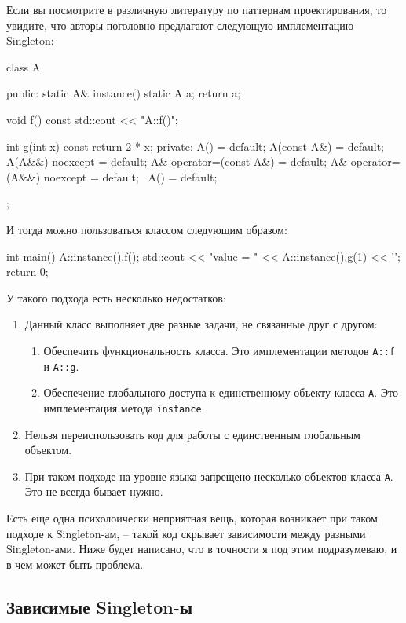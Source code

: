 Если вы посмотрите в различную литературу по паттернам проектирования, то увидите, что авторы поголовно предлагают следующую имплементацию Singleton:
\begin{cppcode}
class A {
public:
  static A& instance() {
    static A a;
    return a;
  }
  
  void f() const {
    std::cout << "A::f()\n";
  }
  
  int g(int x) const {
    return 2 * x;
  }
private:
  A() = default;
  A(const A&) = default;
  A(A&&) noexcept = default;
  A& operator=(const A&) = default;
  A& operator=(A&&) noexcept = default;
  ~A() = default;
};
\end{cppcode}
И тогда можно пользоваться классом следующим образом:
\begin{cppcode}
int main() {
  A::instance().f();
  std::cout << "value = " << A::instance().g(1) << '\n';
  return 0;
}
\end{cppcode}
У такого подхода есть несколько недостатков:
\begin{enumerate}
\item Данный класс выполняет две разные задачи, не связанные друг с другом:
\begin{enumerate}
\item Обеспечить функциональность класса.
Это имплементации методов \verb"A::f" и \verb"A::g".

\item Обеспечение глобального доступа к единственному объекту класса \verb"A".
Это имплементация метода \verb"instance".
\end{enumerate}

\item Нельзя переиспользовать код для работы с единственным глобальным объектом.

\item При таком подходе на уровне языка запрещено несколько объектов класса \verb"A".
Это не всегда бывает нужно.
\end{enumerate}
Есть еще одна психолоически неприятная вещь, которая возникает при таком подходе к Singleton-ам, -- такой код скрывает зависимости между разными Singleton-ами.
Ниже будет написано, что в точности я под этим подразумеваю, и в чем может быть проблема.

\subsection{Зависимые Singleton-ы}

